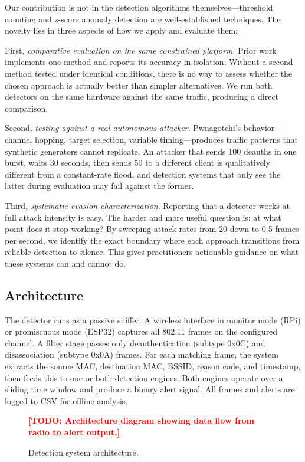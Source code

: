 \documentclass[conference]{IEEEtran}
\newcommand{\placeholder}[1]{\textcolor{red}{\textbf{[TODO: #1]}}}
\begin{document}
Our contribution is not in the detection algorithms themselves---threshold counting and z-score anomaly detection are well-established techniques. The novelty lies in three aspects of how we apply and evaluate them:

First, \textit{comparative evaluation on the same constrained platform}. Prior work implements one method and reports its accuracy in isolation. Without a second method tested under identical conditions, there is no way to assess whether the chosen approach is actually better than simpler alternatives. We run both detectors on the same hardware against the same traffic, producing a direct comparison.

Second, \textit{testing against a real autonomous attacker}. Pwnagotchi's behavior---channel hopping, target selection, variable timing---produces traffic patterns that synthetic generators cannot replicate. An attacker that sends 100 deauths in one burst, waits 30 seconds, then sends 50 to a different client is qualitatively different from a constant-rate flood, and detection systems that only see the latter during evaluation may fail against the former.

Third, \textit{systematic evasion characterization}. Reporting that a detector works at full attack intensity is easy. The harder and more useful question is: at what point does it stop working? By sweeping attack rates from 20 down to 0.5 frames per second, we identify the exact boundary where each approach transitions from reliable detection to silence. This gives practitioners actionable guidance on what these systems can and cannot do.

\subsection{Architecture}

The detector runs as a passive sniffer. A wireless interface in monitor mode (RPi) or promiscuous mode (ESP32) captures all 802.11 frames on the configured channel. A filter stage passes only deauthentication (subtype 0x0C) and disassociation (subtype 0x0A) frames. For each matching frame, the system extracts the source MAC, destination MAC, BSSID, reason code, and timestamp, then feeds this to one or both detection engines. Both engines operate over a sliding time window and produce a binary alert signal. All frames and alerts are logged to CSV for offline analysis.

\begin{figure}[htbp]
\centering
\placeholder{Architecture diagram showing data flow from radio to alert output.}
\caption{Detection system architecture.}
\label{fig:architecture}
\end{figure}
\end{document}
